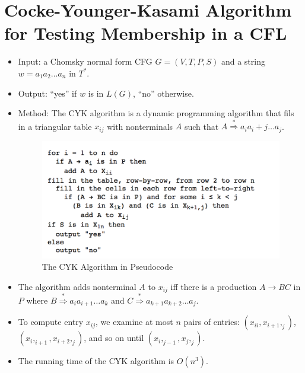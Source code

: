 \documentclass[]{article}
\begin{document}
\section{Cocke-Younger-Kasami Algorithm for Testing Membership in a CFL}
  \begin{itemize}
    \item Input: a Chomsky normal form CFG $G = (V,T,P,S)$ and a string $w = 
    a_1a_2\ldots{a_n}$ in $T^*$.
    \item Output: ``yes'' if $w$ is in $L(G)$, ``no'' otherwise.
    \item Method: The CYK algorithm is a dynamic programming algorithm that 
    fils in a triangular table $x_{ij}$ with nonterminals $A$ such that $A 
    \overset{*}{\Rightarrow} a_ia_i+j\ldots{a_j}$.
      \begin{figure}[p]
        \includegraphics{./img/CYK_Algorithm.png}
        \caption{The CYK Algorithm in Pseudocode}
      \end{figure}
    \item The algorithm adds nonterminal $A$ to $x_{ij}$ iff there is a 
    production $A \rightarrow BC$ in $P$ where $B \overset{*}{\Rightarrow}
    a_ia_{i+1}\ldots{a_k}$ and $C \overset{*}{\Rightarrow}a_{k+1}a_{k
    +2}\ldots{a_j}$.
    \item To compute entry $x_{ij}$, we examine at most $n$ pairs of entries: 
    $(x_{ii},x_{i+1},_j)$,$(x_i,_{i+1},x_{i+2},_j)$, and so on until $
    (x_i,_{j-1},x_{j},_j)$.
    \item The running time of the CYK algorithm is $O(n^3)$.
  \end{itemize}
\end{document}
